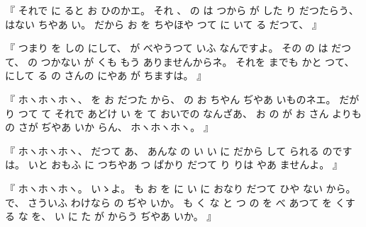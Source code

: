 %
『
それで
に
ると
お
ひのかエ。
%
それ
、
%
の
は
つから
が
した
り
だつたらう、
%
はない
ちやあ
い。
%
だから
お
を
ちやほや
つて
に
いて
る
だつて、
』

%
『
つまり
を
しの
にして、
%
が%
べやうつて
いふ
なんですよ。
%
その
の
は
だつて、
%
の
つかない
が
くも%
%
もう
ありませんからネ。
%
それを
までも
かと
つて、
%
にして
る
の
さんの
にやあ
が
ちますは。
』

%
『
ホヽホヽホヽ、
%
を
お
だつた
から、
%
の
お
ちやん
ぢやあ
いものネエ。
%
だが
り
つて
て
それで
あどけ
い
を
て
おいでの
なんざあ、
%
お
の
が
お
さん
よりも
の
さが
ぢやあ
いか
らん、
%
ホヽホヽホヽ。
』

%
『
ホヽホヽホヽ、
%
だつて
あ、
%
あんな
の
い
い
に
だから
して
られる
のですは。
%
いと
おもふ
に
つちやあ
つ
ぱかり
だつて
り
りは
やあ
ませんよ。
』

%
『
ホヽホヽホヽ。
%
いゝよ。
%
も
お
を
に
い
に
おなり
だつて
ひや
ない
から。
%
で、
%
さういふ
わけなら
の
ぢや
いか。
%
も
く
な
と
つ
の
を
べ
あつて
を
くする
な
を、
%
い
に
た
が
からう
ぢやあ
いか。
』

